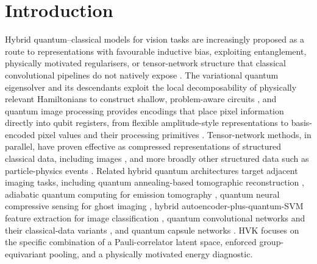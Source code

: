 \documentclass[pdflatex,sn-basic]{sn-jnl}
\begin{document}

\maketitle
\tableofcontents
\section{Introduction}
\label{sec:intro}

Hybrid quantum--classical models for vision tasks are increasingly proposed as a
route to representations with favourable inductive bias, exploiting entanglement,
physically motivated regularisers, or tensor-network structure that classical
convolutional pipelines do not natively expose
\citep{Cerezo2021, Tilly2022, Preskill2018}. The variational quantum eigensolver
and its descendants exploit the local decomposability of physically relevant
Hamiltonians to construct shallow, problem-aware circuits
\citep{Cerezo2021, Tilly2022, Bauer2020}, and quantum image processing provides
encodings that place pixel information directly into qubit registers, from
flexible amplitude-style representations \citep{Le2011} to basis-encoded pixel
values \citep{Zhang2013} and their processing primitives
\citep{Chakraborty2018, Zhou2017, Yao2017}. Tensor-network methods, in parallel,
have proven effective as compressed representations of structured classical
data, including images
\citep{Cirac2021, Latorre2005, Han2018, Stoudenmire2016, Ran2020TNCS, Guala2023},
and more broadly other structured data such as particle-physics events
\citep{Araz2022}. Related hybrid quantum architectures target adjacent imaging
tasks, including quantum annealing-based tomographic reconstruction
\citep{Haga2024}, adiabatic quantum computing for emission tomography
\citep{Nau2023}, quantum neural compressive sensing for ghost imaging
\citep{Zhai2025}, hybrid autoencoder-plus-quantum-SVM feature extraction for
image classification \citep{Slabbert2024}, quantum convolutional networks and
their classical-data variants \citep{Cong2019, Hur2022}, and quantum capsule
networks \citep{Liu2022}. HVK focuses on the specific combination of a
Pauli-correlator latent space, enforced group-equivariant pooling, and a
physically motivated energy diagnostic.
\end{document}
